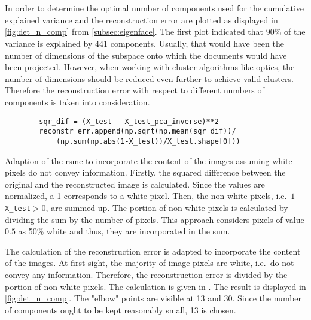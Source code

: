 \section{\eigendocs{}}\label{sec:evaluation-eigendocs}

In order to determine the optimal number of components used for \eigendocs{} the cumulative explained variance and the reconstruction error are plotted 
as displayed in \autoref{fig:det_n_comp} from \autoref{subsec:eigenface}.
The first plot indicated that 90\% of the variance is explained by 441 components.
Usually, that would have been the number of dimensions of the subspace onto which the documents would have been projected.
However, when working with cluster algorithms like \ac{optics}, the number of dimensions should be reduced even further to achieve valid clusters.
Therefore the reconstruction error with respect to different numbers of components is taken into consideration.

\begin{listing}[htp]
    \begin{verbatim}
        sqr_dif = (X_test - X_test_pca_inverse)**2
        reconstr_err.append(np.sqrt(np.mean(sqr_dif))/
            (np.sum(np.abs(1-X_test))/X_test.shape[0])) 
    \end{verbatim}
    \caption[Adaption of the \ac{rsme}]{
        Adaption of the \ac{rsme} to incorporate the content of the images assuming white pixels do not convey information.
        Firstly, the squared difference between the original and the reconstructed image is calculated.
        Since the values are normalized, a 1 corresponds to a white pixel.
        Then, the non-white pixels, i.e.\ $1-$\texttt{X\_test}$> 0$, are summed up.
        The portion of non-white pixels is calculated by dividing the sum by the number of pixels.
        This approach considers pixels of value $0.5$ as 50\% white and thus, they are incorporated in the sum.
    }
    \label{lst:impl-weighted-rsme}
\end{listing}

The calculation of the reconstruction error is adapted to incorporate the content of the images.
At first sight, the majority of image pixels are white, i.e.\ do not convey any information.
Therefore, the reconstruction error is divided by the portion of non-white pixels. 
The calculation is given in .
The result is displayed in \autoref{fig:det_n_comp}.
The "elbow" points are visible at 13 and 30.
Since the number of components ought to be kept reasonably small, 13 is chosen.


